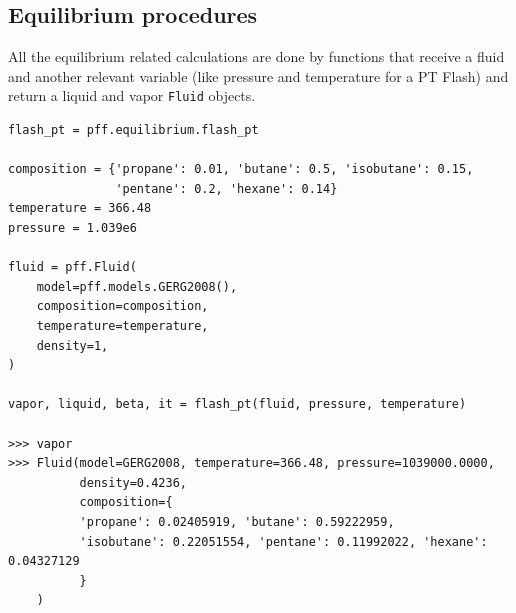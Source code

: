 \documentclass[a0,portrait]{a0poster}
\begin{document}
\begin{multicols}{2}
\begin{multicols}{2}
\end{multicols}

\subsection*{Equilibrium procedures}
All the equilibrium related calculations are done by functions that receive a
fluid and another relevant variable (like pressure and temperature for a PT
Flash) and return a liquid and vapor \texttt{Fluid} objects.

\begin{multicols}{2}
    

\begin{verbatim}
flash_pt = pff.equilibrium.flash_pt

composition = {'propane': 0.01, 'butane': 0.5, 'isobutane': 0.15,
               'pentane': 0.2, 'hexane': 0.14}
temperature = 366.48
pressure = 1.039e6

fluid = pff.Fluid(
    model=pff.models.GERG2008(),
    composition=composition,
    temperature=temperature,
    density=1,
)

vapor, liquid, beta, it = flash_pt(fluid, pressure, temperature)

>>> vapor
>>> Fluid(model=GERG2008, temperature=366.48, pressure=1039000.0000, 
          density=0.4236, 
          composition={
          'propane': 0.02405919, 'butane': 0.59222959, 
          'isobutane': 0.22051554, 'pentane': 0.11992022, 'hexane': 0.04327129
          }
    )
\end{verbatim}


\end{multicols}
\end{multicols}
\end{document}
